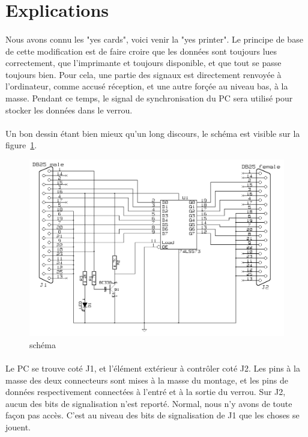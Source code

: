 \documentclass[11pt,a4paper]{book}
\begin{document}
\section*{Explications}

\paragraph*{}
Nous avons connu les "yes cards", voici venir la "yes printer". Le principe de
 base de cette modification est de faire croire que les donn\'ees sont toujours lues
 correctement, que l'imprimante et toujours disponible, et que tout se passe toujours bien.
  Pour cela, une partie des
 signaux est directement renvoy\'ee \`a l'ordinateur, comme accus\'e r\'eception, et
 une autre for\c{c}\'ee au niveau bas, \`a la masse. Pendant ce temps, le signal de 
 synchronisation du PC sera utilis\'e pour stocker les donn\'ees dans le verrou.
 
 \paragraph*{}
 Un bon dessin \'etant bien mieux qu'un long discours, le sch\'ema est visible sur la figure~\ref{latch1}.
 
 \begin{figure}
 \center
 \includegraphics[scale=1.1]{./medias/latch1.png}
 \caption{sch\'ema}
 \label{latch1}
 \end{figure}
 
\paragraph*{}
Le PC se trouve cot\'e J1, et l'\'el\'ement ext\'erieur \`a contr\^oler cot\'e J2. Les pins \`a
la masse des deux connecteurs sont mises \`a la masse du montage, et les pins de donn\'ees 
respectivement connect\'ees \`a l'entr\'e et \`a la sortie du verrou. Sur J2, aucun des bits
de signalisation n'est report\'e. Normal, nous n'y avons de toute fa\c{c}on pas acc\`es.
C'est au niveau des bits de signalisation de J1 que les choses se jouent.
\end{document}
